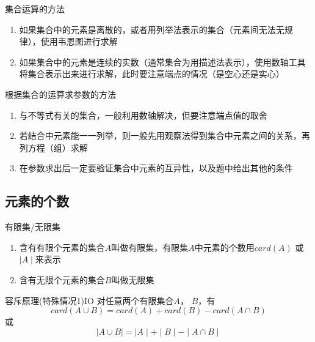 \begin{note}{集合运算的方法}
	\begin{enumerate}
		\item 如果集合中的元素是离散的，或者用列举法表示的集合（元素间无法无规律），使用韦恩图进行求解
		\item 如果集合中的元素是连续的实数（通常集合为用描述法表示），使用数轴工具将集合表示出来进行求解，此时要注意端点的情况（是空心还是实心）
	\end{enumerate}
\end{note}


\begin{note}{根据集合的运算求参数的方法}
	\begin{enumerate}
		\item 与不等式有关的集合，一般利用数轴解决，但要注意端点值的取舍
		\item 若结合中元素能一一列举，则一般先用观察法得到集合中元素之间的关系，再列方程（组）求解
		\item 在参数求出后一定要验证集合中元素的互异性，以及题中给出其他的条件
	\end{enumerate}
\end{note}

\subsection{元素的个数}

\begin{definition}{有限集/无限集}{}
	\begin{enumerate}
		\item 含有\textcolor{third}{有限个元素}的集合$A$叫做\textcolor{third}{有限集}，有限集$A$中元素的个数用$card\left(A\right)$ 或 $\mid A \mid$来表示
		\item 含有\textcolor{third}{无限个元素}的集合$B$叫做\textcolor{third}{无限集}
	\end{enumerate}
\end{definition}

\begin{theorem}{容斥原理(特殊情况1)}{IO}
对任意两个有限集合$A$， $B$，有
\begin{equation}
card\left(A \cup B \right) = card\left(A\right) + card\left(B\right) - card\left(A \cap B \right)
\end{equation}
或
\begin{equation}
\mid A \cup B \mid = \mid A \mid + \mid B \mid - \mid A \cap B \mid
\end{equation}
\end{theorem}

